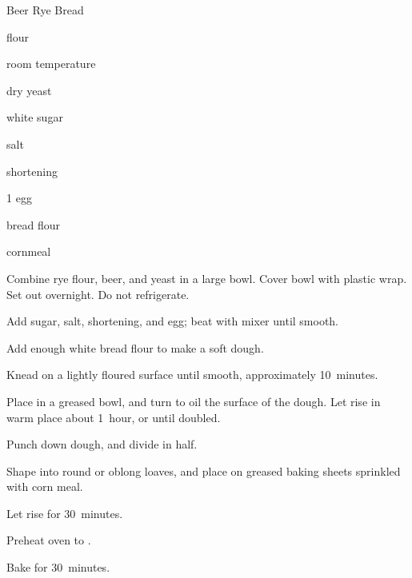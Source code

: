\begin{recipe}{Beer Rye Bread}{}{}

\begin{ingredients}
\item {}  flour
\item \C{1\half} room temperature 
\item \tp{4\half} dry yeast
\item {} white sugar
\item {} salt
\item {} shortening
\item 1 egg
\item {} bread flour
\item {} cornmeal
\end{ingredients}

\begin{directions}
\item Combine rye flour, beer, and yeast in a large bowl. Cover bowl with plastic wrap. Set out overnight. Do not refrigerate.
\item Add sugar, salt, shortening, and egg; beat with mixer until smooth.
\item Add enough white bread flour to make a soft dough.
\item Knead on a lightly floured surface until smooth, approximately 10~minutes.
\item Place in a greased bowl, and turn to oil the surface of the dough. Let rise in warm place about 1~hour, or until doubled.
\item Punch down dough, and divide in half.
\item Shape into round or oblong loaves, and place on greased baking sheets sprinkled with corn meal.
\item Let rise for 30~minutes.
\item Preheat oven to .
\item Bake for 30~minutes.
\end{directions}

\end{recipe}
